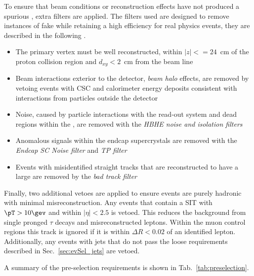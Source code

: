 To ensure that beam conditions or reconstruction effects have
not produced a spurious \MET, extra filters are applied. The filters
used are designed to remove instances of fake \MET while retaining
a high efficiency for real physics events, they are described in the
following \cite{1748-0221-10-02-P02006}.
\begin{itemize}
\item{The primary vertex must be well reconstructed, within
$|z|<=24$~cm of the proton collision region and $d_{xy}<2$~cm from the
beam line}
\item{Beam interactions exterior to the detector, \emph{beam halo} effects,
are removed by vetoing events with \ac{CSC} and calorimeter energy
deposits consistent with interactions from particles outside the
detector}
\item{Noise, caused by particle interactions with the read-out system
and dead regions within the \HCAL, are removed with the \emph{HBHE
noise and isolation filters}}
\item{Anomalous signals within the \ECAL endcap supercrystals are removed
with the \emph{\ECAL Endcap SC Noise filter} and \emph{\ECAL \ac{TP}
filter}}
\item{Events with misidentified straight tracks that are reconstructed
to have a large \pT are removed by the \emph{bad track filter}}
\end{itemize}

Finally, two additional vetoes are applied to ensure events are purely
hadronic with minimal misreconstruction. Any events that contain a
\ac{SIT} with $\pT > 10\gev$ and within $|\eta| < 2.5$ is vetoed. This
reduces the background from single pronged $\tau$ decays and
misreconstructed leptons. Within the muon control regions this track
is ignored if it is within $\Delta R <0.02$ of an identified lepton.
Additionally, any events with jets that do not pass the loose
requirements described in Sec.~\ref{sec:evSel_jets} are vetoed.

A summary of the pre-selection requirements is shown in
Tab.~\ref{tab:preselection}.

